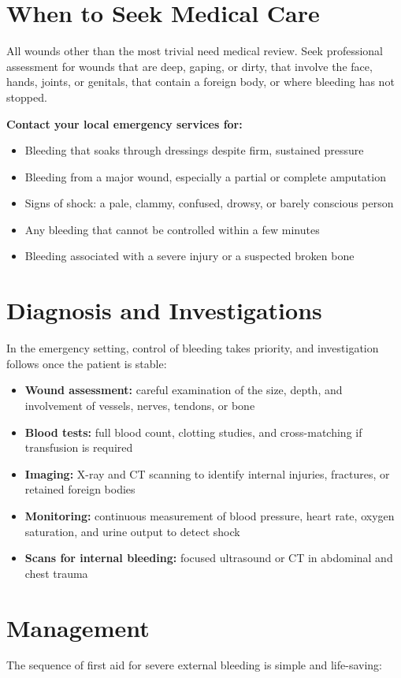 \section*{When to Seek Medical Care}
All wounds other than the most trivial need medical review. Seek professional assessment for wounds that are deep, gaping, or dirty, that involve the face, hands, joints, or genitals, that contain a foreign body, or where bleeding has not stopped.

\textbf{Contact your local emergency services for:}
\begin{itemize}
    \item Bleeding that soaks through dressings despite firm, sustained pressure
    \item Bleeding from a major wound, especially a partial or complete amputation
    \item Signs of shock: a pale, clammy, confused, drowsy, or barely conscious person
    \item Any bleeding that cannot be controlled within a few minutes
    \item Bleeding associated with a severe injury or a suspected broken bone
\end{itemize}

\section*{Diagnosis and Investigations}
In the emergency setting, control of bleeding takes priority, and investigation follows once the patient is stable:

\begin{itemize}
    \item \textbf{Wound assessment:} careful examination of the size, depth, and involvement of vessels, nerves, tendons, or bone
    \item \textbf{Blood tests:} full blood count, clotting studies, and cross-matching if transfusion is required
    \item \textbf{Imaging:} X-ray and CT scanning to identify internal injuries, fractures, or retained foreign bodies
    \item \textbf{Monitoring:} continuous measurement of blood pressure, heart rate, oxygen saturation, and urine output to detect shock
    \item \textbf{Scans for internal bleeding:} focused ultrasound or CT in abdominal and chest trauma
\end{itemize}

\section*{Management}
The sequence of first aid for severe external bleeding is simple and life-saving:

